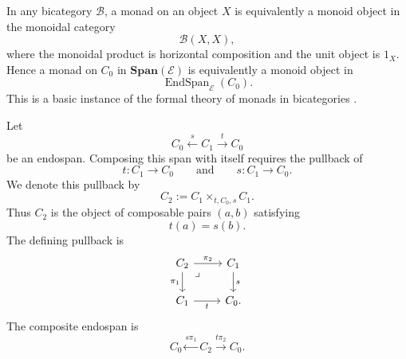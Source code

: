 \begin{remark}
\label{rem:monads-as-monoids-in-endohom}
    In any bicategory \(\mathcal B\), a monad on an object \(X\) is equivalently a monoid object in the monoidal category
    \[
        \mathcal B(X,X),
    \]
    where the monoidal product is horizontal composition and the unit object is \(1_X\). Hence a monad on \(C_0\) in \(\mathbf{Span}(\mathcal E)\) is equivalently a monoid object in
    \[
        \operatorname{EndSpan}_{\mathcal E}(C_0).
    \]
    This is a basic instance of the formal theory of monads in bicategories \cite{StreetFormalTheoryOfMonads}.
\end{remark}

Let
\[
    C_0 \xleftarrow{s} C_1 \xrightarrow{t} C_0
\]
be an endospan. Composing this span with itself requires the pullback of
\[
    t:C_1\to C_0
    \qquad\text{and}\qquad
    s:C_1\to C_0.
\]
We denote this pullback by
\[
    C_2:=C_1\times_{t,C_0,s}C_1.
\]
Thus \(C_2\) is the object of composable pairs \((a,b)\) satisfying
\[
    t(a)=s(b).
\]
The defining pullback is
\[
    \begin{tikzcd}
            C_2
                \arrow[r, "\pi_2"]
                \arrow[d, "\pi_1"']
                \arrow[dr, phantom, "\lrcorner", very near start]
        &
            C_1
                \arrow[d, "s"]
        \\
            C_1
                \arrow[r, "t"']
        &
            C_0.
    \end{tikzcd}
\]
The composite endospan is
\[
    C_0
    \xleftarrow{s\pi_1}
    C_2
    \xrightarrow{t\pi_2}
    C_0.
\]

